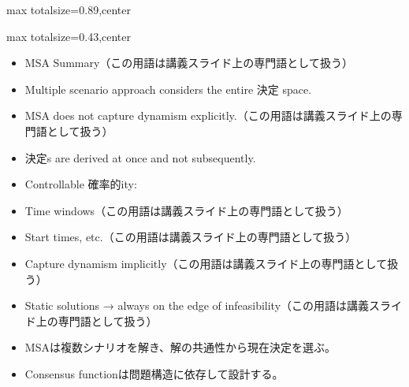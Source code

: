 \begin{minipage}[t]{0.58\textwidth}
\begin{adjustbox}{max totalsize={\textwidth}{0.89\textheight},center}
\begin{minipage}{\textwidth}
\end{minipage}
\end{adjustbox}
\end{minipage}


\clearpage
{}
\begin{minipage}[t]{0.405\textwidth}
\begin{adjustbox}{max totalsize={\textwidth}{0.43\textheight},center}
\begin{minipage}{\textwidth}\scriptsize
{}\begin{itemize}
\item MSA Summary（この用語は講義スライド上の専門語として扱う）
\item Multiple scenario approach considers the entire 決定 space.
\item MSA does not capture dynamism explicitly.（この用語は講義スライド上の専門語として扱う）
\item 決定s are derived at once and not subsequently.
\item Controllable 確率的ity:
\item Time windows（この用語は講義スライド上の専門語として扱う）
\item Start times, etc.（この用語は講義スライド上の専門語として扱う）
\item Capture dynamism implicitly（この用語は講義スライド上の専門語として扱う）
\item Static solutions → always on the edge of infeasibility（この用語は講義スライド上の専門語として扱う）
\end{itemize}\begin{itemize}
\item MSAは複数シナリオを解き、解の共通性から現在決定を選ぶ。
\item Consensus functionは問題構造に依存して設計する。
\end{itemize}
\end{minipage}
\end{adjustbox}
\end{minipage}\hfill
